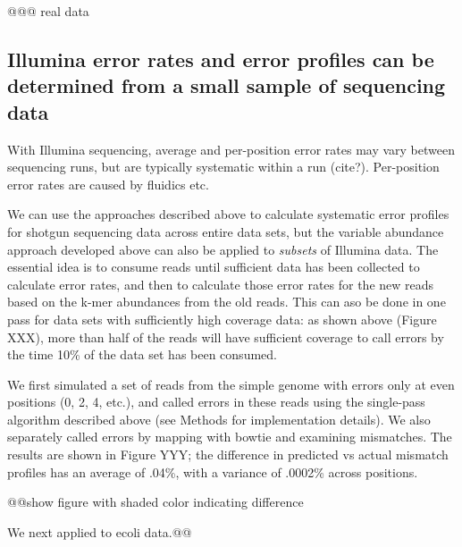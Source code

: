 @@@ real data

\subsection{Illumina error rates and error profiles can be determined from a
small sample of sequencing data}

With Illumina sequencing, average and per-position error rates may
vary between sequencing runs, but are typically systematic within a
run (cite?).  Per-position error rates are caused by fluidics etc.

We can use the approaches described above to calculate systematic
error profiles for shotgun sequencing data across entire data sets,
but the variable abundance approach developed above can also be
applied to {\em subsets} of Illumina data.  The essential idea is to
consume reads until sufficient data has been collected to calculate
error rates, and then to calculate those error rates for the new reads
based on the k-mer abundances from the old reads.  This can aso be
done in one pass for data sets with sufficiently high coverage data:
as shown above (Figure XXX), more than half of the reads will have
sufficient coverage to call errors by the time 10\% of the data set
has been consumed.

We first simulated a set of reads from the simple genome with errors
only at even positions (0, 2, 4, etc.), and called errors in these
reads using the single-pass algorithm described above (see Methods for
implementation details).  We also separately called errors by mapping
with bowtie and examining mismatches.  The results are shown in Figure
YYY; the difference in predicted vs actual mismatch profiles has an
average of .04\%, with a variance of .0002\% across positions.

@@show figure with shaded color indicating difference

We next applied to ecoli data.@@


